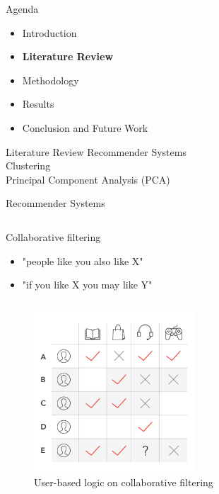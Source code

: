 \begin{frame}{Agenda}
\begin{itemize}
    \item Introduction
    \item \textbf{Literature Review}
    \item Methodology
    \item Results
    \item Conclusion and Future Work
\end{itemize}
\end{frame}


\begin{frame}{Literature Review} \pause
    Recommender Systems\\ \pause
    \vspace{0.5cm}
    Clustering\\ \pause
    \vspace{0.5cm}
    Principal Component Analysis (PCA)
\end{frame}


\begin{frame}{Recommender Systems} \pause
    \begin{column}{.4\linewidth}
        Collaborative filtering \pause
        \begin{itemize}
            \item "people like you also like X"
            \item "if you like X  you may like Y"
        \end{itemize}
    \end{column} \pause
    \begin{column}{.6\linewidth}
        \begin{figure}
           \centering
           \includegraphics[width=6cm]{fig/ch2-colab-filt-user-user.jpg}
           \caption{User-based logic on collaborative filtering}
        \end{figure}
    \end{column}
\end{frame}

